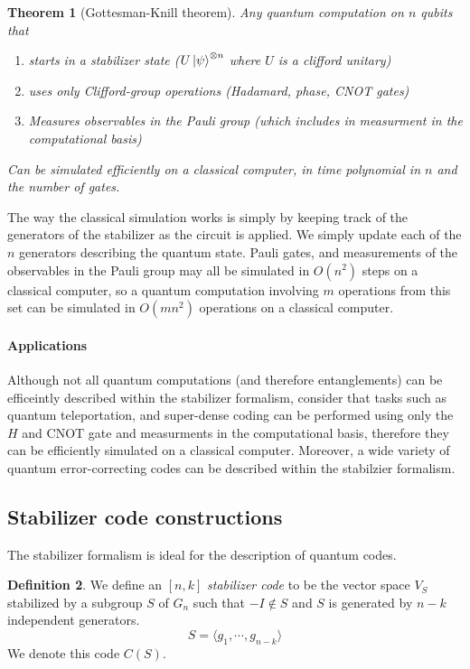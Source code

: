 \documentclass[11pt,a4paper]{article}
\theoremstyle{definition}
\newtheorem{definition}{Definition}[section]
\theoremstyle{plain}
\newtheorem{theorem}[definition]{Theorem}
\theoremstyle{remark}
\begin{document}
\begin{theorem}[Gottesman-Knill theorem]\label{thm:Gottesman-Knill}
    Any quantum computation on $n$ qubits that 
    \begin{enumerate}
      \item starts in a stabilizer state ($U \ket{\psi} ^{\otimes n}$ where $U$ is a clifford unitary)
      \item uses only Clifford-group operations (Hadamard, phase, CNOT gates) 
      \item Measures observables in the Pauli group (which includes in measurment in the computational basis) 
    \end{enumerate}
    Can be simulated efficiently on a classical computer, in time polynomial in $n$ and the number of gates.
\end{theorem} 

The way the classical simulation works is simply by keeping track of the generators of the stabilizer as the circuit is applied. 
We simply update each of the $n$ generators describing the quantum state. Pauli gates, and measurements of the observables in 
the Pauli group may all be simulated in $O(n^2)$ steps on a classical computer, so a quantum computation involving $m$ operations 
from this set can be simulated in $O(m n^2)$ operations on a classical computer.

\paragraph{Applications} Although not all quantum computations (and therefore entanglements) 
can be efficeintly described within the stabilizer formalism, consider that tasks such as 
quantum teleportation, and super-dense coding can be performed using only the $H$ and CNOT gate and 
measurments in the computational basis, therefore they can be efficiently simulated on a classical computer. 
Moreover, a wide variety of quantum error-correcting codes can be described within the stabilzier formalism. 

\subsection{Stabilizer code constructions} 
The stabilizer formalism is ideal for the description of quantum codes. 
\begin{definition}
  We define an $[n,k]$ \emph{stabilizer code} to be the vector space $V_S$ stabilized by a subgroup $S$ of $G_n$ such that 
  $-I \not\in S$ and $S$ is generated by $n - k$ independent generators. 
  $$S = \langle g_1, \cdots, g_{n-k}\rangle$$
  We denote this code $C(S)$.  
\end{definition}
\end{document}
